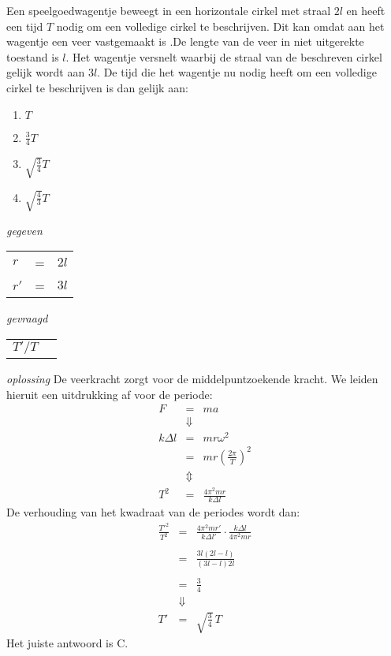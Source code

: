\documentclass{ximera}
\begin{document}
\begin{exercise} Een speelgoedwagentje beweegt in een horizontale cirkel met straal
$2l$ en heeft een tijd $T$ nodig om een volledige cirkel te
beschrijven. Dit kan omdat aan het wagentje een veer vastgemaakt is
.De lengte van de veer in niet uitgerekte toestand is $l$. Het
wagentje versnelt waarbij de straal van de beschreven cirkel gelijk
wordt aan $3l$.
\newline
De tijd die het wagentje nu nodig heeft om een volledige cirkel te
beschrijven is dan gelijk aan:
\begin{enumerate}
\item $T$
\item $\frac{3}{4}T$
\item $\sqrt{\frac{3}{4}}T$
\item $\sqrt{\frac{4}{3}}T$
\end{enumerate}
\begin{oplossing}
\textit{gegeven}
\begin{tabular}[t]{lcl}
$r$&=&$2l$\\
$r'$&=&$3l$\\
\end{tabular}

\textit{gevraagd}
\begin{tabular}[t]{ll}
$T'/T$
\end{tabular}

\textit{oplossing} De veerkracht zorgt voor de middelpuntzoekende kracht. We leiden hieruit een uitdrukking af voor de periode:
\begin{eqnarray*}
F&=&ma\\
&\Downarrow&\\
k\Delta l &=& mr\omega^2\\
&=&  mr\left(\frac{2\pi}{T}\right)^2\\
&\Updownarrow&\\
T^2&=&\frac{4\pi^2mr}{k\Delta l}
\end{eqnarray*}
De verhouding van het kwadraat van de periodes wordt dan:
\begin{eqnarray*}
\frac{T'^2}{T^2}&=&\frac{4\pi^2mr'}{k\Delta l'}\cdot\frac{k\Delta l}{4\pi^2mr}\\
&&\\
&=&\frac{3l(2l-l)}{(3l-l)2l}\\
&&\\
&=&\frac{3}{4}\\
&\Downarrow&\\
T'&=&\sqrt{\frac{3}{4}}\,T
\end{eqnarray*}
Het juiste antwoord is C.
\end{oplossing}





\end{exercise}
\end{document}
